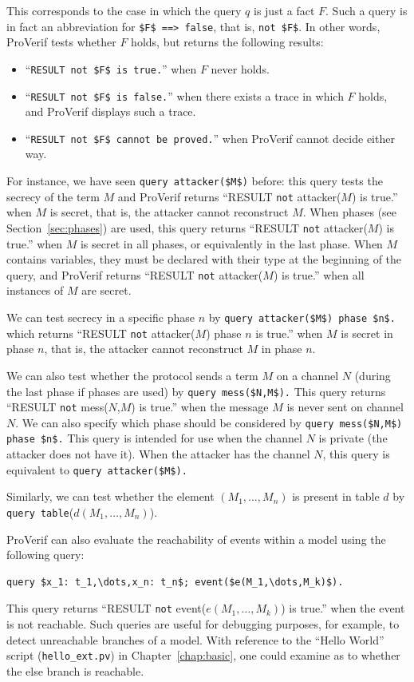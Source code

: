 \documentclass{book}
\begin{document}
This corresponds to the case in which the query $q$ is just a fact $F$. Such a query is in fact an abbreviation for \lstinline{$F$ ==> false},
that is, \lstinline{not $F$}. In other words, ProVerif tests whether $F$ holds, but returns the following results:
\begin{itemize}
\item ``\lstinline{RESULT not $F$ is true.}'' when $F$ never holds.
\item ``\lstinline{RESULT not $F$ is false.}'' when there exists a trace in which $F$ holds, and ProVerif displays such a trace.
\item ``\lstinline{RESULT not $F$ cannot be proved.}'' when ProVerif cannot decide either way.
\end{itemize}
For instance, we have seen \lstinline!query attacker($M$)!
before: this query tests the secrecy of the term $M$ and ProVerif returns ``RESULT \lstinline{not} attacker($M$) is true.'' when $M$ is secret, that is, the attacker cannot reconstruct $M$. When phases (see Section~\ref{sec:phases}) are used, this query returns ``RESULT \lstinline{not} attacker($M$) is true.'' when $M$ is secret in all phases, or equivalently in the last phase. When $M$ contains variables, they must be declared with their type at the beginning of the query, and ProVerif returns ``RESULT \lstinline{not} attacker($M$) is true.'' when all instances of $M$ are secret.

We can test secrecy in a specific phase $n$ by
\lstinline!query attacker($M$) phase $n$.!
which returns ``RESULT \lstinline{not} attacker($M$) phase $n$ is true.'' when $M$ is secret in phase $n$, that is, the attacker cannot reconstruct $M$ in phase $n$.

We can also test whether the protocol sends a term $M$ on a channel $N$ (during the last phase if phases are used) by
\lstinline!query mess($N,M$).! This query returns ``RESULT \lstinline{not} mess($N$,$M$) is true.'' when the message $M$ is never sent on channel $N$.
We can also specify which phase should be considered by
\lstinline!query mess($N,M$) phase $n$.!
This query is intended for use when the channel $N$ is private (the attacker does not have it). When the attacker has the channel $N$, this query is equivalent to \lstinline!query attacker($M$).!

Similarly, we can test whether the element $(M_1, \ldots, M_n)$ is present in table $d$ by
\lstinline!query table!($d(M_1, \allowbreak \ldots, \allowbreak M_n)$).

ProVerif can also evaluate the reachability of events within a model using the following query:
%
\begin{lstlisting}[numbers=none]
	query $x_1: t_1,\dots,x_n: t_n$; event($e(M_1,\dots,M_k)$).
\end{lstlisting}
%
This query returns ``RESULT \lstinline{not} event($e(M_1,\dots,M_k)$) is true.'' when the event is not reachable.
Such queries are useful for debugging purposes, for example, to detect unreachable branches of a model. With reference to the ``Hello World'' script (\texttt{{\docexdir}hello\_ext.pv}) in Chapter~\ref{chap:basic}, one could examine as to whether the else branch is reachable.
\end{document}
